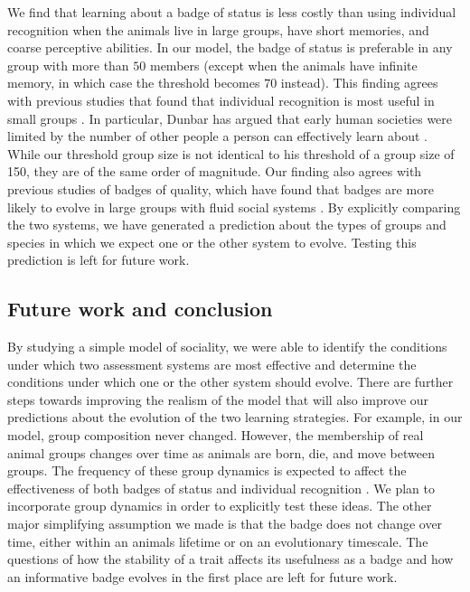 We find that learning about a badge of status is less costly than using individual recognition when the animals live in large groups, have short memories, and coarse perceptive abilities. In our model, the badge of status is preferable in any group with more than $50$ members (except when the animals have infinite memory, in which case the threshold becomes $70$ instead). This finding agrees with previous studies that found that individual recognition is most useful in small groups \citep{Veiga:1993fk}. In particular, Dunbar has argued that early human societies were limited by the number of other people a person can effectively learn about \citep{Dunbar:1993zr,Hill:2003ly}. While our threshold group size is not identical to his threshold of a group size of 150, they are of the same order of magnitude. Our finding also agrees with previous studies of badges of quality, which have found that badges are more likely to evolve in large groups with fluid social systems \citep{Rohwer:1975fk,Tibbetts:2009kx}. By explicitly comparing the two systems, we have generated a prediction about the types of groups and species in which we expect one or the other system to evolve. Testing this prediction is left for future work. 

 
\subsection*{Future work and conclusion}
 
By studying a simple model of sociality, we were able to identify the conditions under which two assessment systems are most effective and determine the conditions under which one or the other system should evolve. There are further steps towards improving the realism of the model that will also improve our predictions about the evolution of the two learning strategies. For example, in our model, group composition never changed. However, the membership of real animal groups changes over time as animals are born, die, and move between groups. The frequency of these group dynamics is expected to affect the effectiveness of both badges of status \citep{Rohwer:1975fk,Tibbetts:2009kx} and individual recognition \citep{Whitfield:1987tg,Veiga:1993fk}. We plan to incorporate group dynamics in order to explicitly test these ideas. The other major simplifying assumption we made is that the badge does not change over time, either within an animals lifetime or on an evolutionary timescale. The questions of how the stability of a trait affects its usefulness as a badge and how an informative badge evolves in the first place are left for future work.

